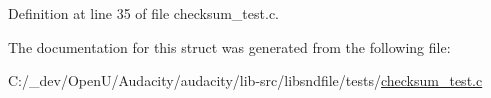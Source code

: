 Definition at line 35 of file checksum\+\_\+test.\+c.



The documentation for this struct was generated from the following file\+:\begin{DoxyCompactItemize}
\item 
C\+:/\+\_\+dev/\+Open\+U/\+Audacity/audacity/lib-\/src/libsndfile/tests/\hyperlink{checksum__test_8c}{checksum\+\_\+test.\+c}\end{DoxyCompactItemize}
